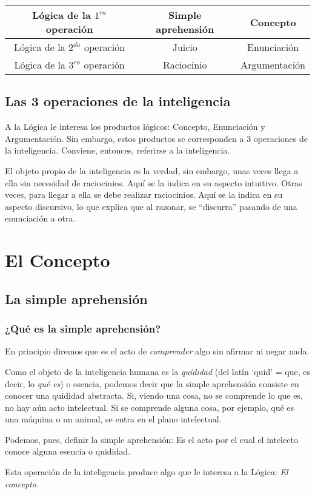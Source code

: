 \documentclass{article}
\begin{document}
\begin{center}
\begin{tabular}{ |c|c|c| } 
    \hline
    Lógica de la $1^{ra}$ operación & Simple aprehensión & Concepto      \\ \hline
    Lógica de la $2^{da}$ operación & Juicio             & Enunciación   \\ \hline
    Lógica de la $3^{ra}$ operación & Raciocinio         & Argumentación \\ 
    \hline
\end{tabular}
\end{center}

\subsection{Las 3 operaciones de la inteligencia}
    A la Lógica le interesa los productos lógicos: Concepto, Enunciación y Argumentación. Sin embargo, estos productos se corresponden a 3 operaciones de la inteligencia. Conviene, entonces, referirse a la inteligencia. \par
    El objeto propio de la inteligencia es la verdad, sin embargo, unas veces llega a ella sin necesidad de raciocinios. Aquí se la indica en su aspecto intuitivo. Otras veces, para llegar a ella se debe realizar raciocinios. Aquí se la indica en su aspecto discursivo, lo que explica que al razonar, se ``discurra'' pasando de una enunciación a otra. 

\newpage

\section{El Concepto}

\subsection{La simple aprehensión}

\subsubsection{¿Qué es la simple aprehensión?}
    En principio diremos que es el acto de \emph{comprender} algo sin afirmar ni negar nada. \par
    Como el objeto de la inteligencia humana es la \emph{quididad} (del latín `quid' = que, es decir, lo \emph{qué es}) o esencia, podemos decir que la simple aprehensión consiste en conocer una quididad abstracta. Si, viendo una cosa, no se comprende lo que es, no hay aún acto intelectual. Si se comprende alguna cosa, por ejemplo, qué es una máquina o un animal, se entra en el plano intelectual. \par
    Podemos, pues, definir la simple aprehensión: Es el acto por el cual el intelecto conoce alguna esencia o quididad. \par 
    Esta operación de la inteligencia produce algo que le interesa a la Lógica: \emph{El concepto}.
\end{document}

